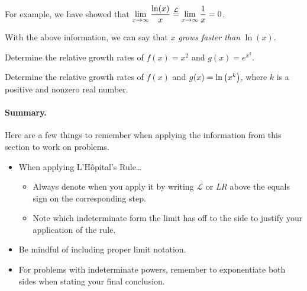 \documentclass[12pt]{article}
\begin{document}

\vspace{5mm}

For example, we have showed that $\displaystyle\lim_{x\to\infty}\frac{\ln(x)}{x}\stackrel{\mathcal{L}}{=}\lim_{x\to\infty}\frac{1}{x}=0$. 

\vspace{2mm}

With the above information, we can say that $x$ \textit{grows faster than} $\ln(x)$.

\vspace{5mm}

\Example Determine the relative growth rates of $f(x)=x^2$ and $g(x)=e^{x^2}$.

\vspace{50mm}

\Example Determine the relative growth rates of $f(x)$ and $g(x)=\ln\left( x^k\right)$, where $k$ is a positive and nonzero real number.

\newpage

\paragraph{Summary.} Here are a few things to remember when applying the information from this section to work on problems.
\begin{itemize}
\item When applying L'H\^opital's Rule\dots
\begin{itemize}
	\item Always denote when you apply it by writing $\mathcal{L}$ or \textit{LR} above the equals sign on the corresponding step.
	\item Note which indeterminate form the limit has off to the side to justify your application of the rule.
\end{itemize}
\item Be mindful of including proper limit notation.
\item For problems with indeterminate powers, remember to exponentiate both sides when stating your final conclusion.
\end{itemize}
\end{document}
